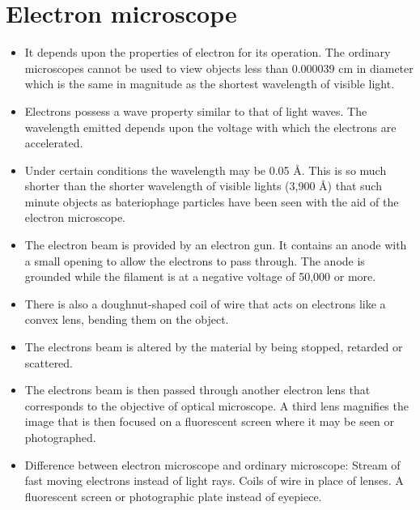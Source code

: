 \documentclass[12pt]{book}
\begin{document}
\section{Electron microscope}
\begin{itemize}

    \item It depends upon the properties of electron for its operation.
The ordinary microscopes cannot be used to view objects less
than 0.000039 cm in diameter which is the same in magnitude
as the shortest wavelength of visible light.
\item Electrons possess a wave property similar to that of light waves.
The wavelength emitted depends upon the voltage with which the
electrons are accelerated.

\item Under certain conditions the wavelength
may be 0.05  \AA  . This is so much shorter than the shorter wavelength
of visible lights (3,900   \AA  ) that such minute objects as bateriophage
particles have been seen with the aid of the electron microscope.

\item The electron beam is provided by an electron gun. It contains an
anode with a small opening to allow the electrons to pass through.
The anode is grounded while the filament is at a negative voltage
of 50,000 or more.

\item There is also a doughnut-shaped coil of wire
that acts on electrons like a convex lens, bending them on the
object.

\item  The electrons beam is altered by the material by being
stopped, retarded or scattered.

\item The electrons beam is then passed through another electron lens that corresponds to the objective of optical microscope.
A third lens magnifies the image that is then focused on a fluorescent screen where it may be seen or
photographed.

\item Difference between electron microscope and ordinary microscope:
 Stream of fast moving electrons instead of light rays.
 Coils of wire in place of lenses.
 A fluorescent screen or photographic plate instead of eyepiece.

\end{itemize}
\end{document}
